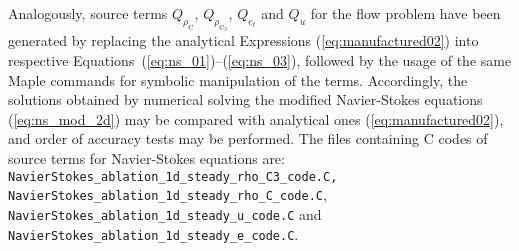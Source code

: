 \documentclass[10pt]{article}
\newcommand{\C}{\text{C}}
\begin{document}
Analogously, source terms $Q_{\rho_{\C}}$, $Q_{\rho_{\C_3}}$, $Q_{e_t}$ and $Q_u$ for the flow problem have been generated by replacing the analytical Expressions (\ref{eq:manufactured02}) into respective Equations~(\ref{eq:ns_01})--(\ref{eq:ns_03}), followed by the usage of the same Maple commands for symbolic manipulation of the terms. Accordingly, the  solutions obtained by numerical solving the  modified Navier-Stokes equations (\ref{eq:ns_mod_2d})  may be compared with analytical ones (\ref{eq:manufactured02}), and order of accuracy tests may be performed. The files containing C codes of source terms for Navier-Stokes equations are:\\ \texttt{NavierStokes\_ablation\_1d\_steady\_rho\_C3\_code.C, NavierStokes\_ablation\_1d\_steady\_rho\_C\_code.C}, \\ \texttt{NavierStokes\_ablation\_1d\_steady\_u\_code.C} and \texttt{NavierStokes\_ablation\_1d\_steady\_e\_code.C}. 
\end{document}
